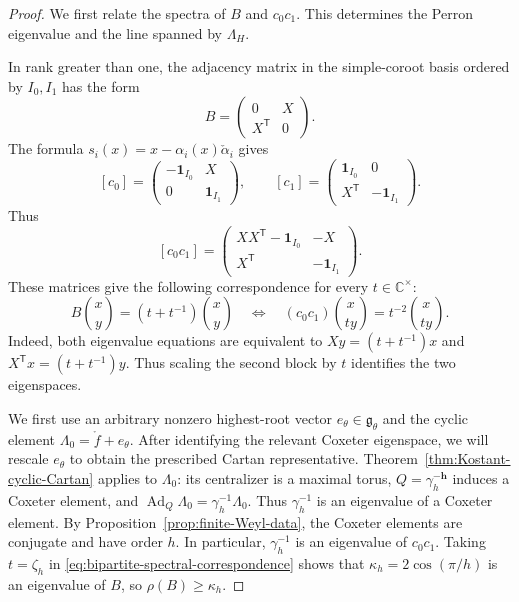 \documentclass[11pt,leqno]{amsart}
\numberwithin{equation}{section}
\theoremstyle{plain}
\theoremstyle{definition}
\theoremstyle{plain}
\theoremstyle{definition}
\theoremstyle{remark}
\newcommand{\g}{\mathfrak g}
\begin{document}
\begin{proof}
We first relate the spectra of $B$ and $c_0c_1$.  This determines the Perron eigenvalue and the line spanned by $\Lambda_H$.

In rank greater than one, the adjacency matrix in the simple-coroot basis ordered by $I_0,I_1$ has the form
\[
 B=\begin{pmatrix}0&X\\X^{\mathsf T}&0\end{pmatrix}.
\]
The formula $s_i(x)=x-\alpha_i(x)\check\alpha_i$ gives
\begin{equation}\label{eq:bipartite-reflection-blocks}
 [c_0]=\begin{pmatrix}-\mathbf1_{I_0}&X\\0&\mathbf1_{I_1}\end{pmatrix},
 \qquad
 [c_1]=\begin{pmatrix}\mathbf1_{I_0}&0\\X^{\mathsf T}&-\mathbf1_{I_1}\end{pmatrix}.
\end{equation}
Thus
\[
 [c_0c_1]=
 \begin{pmatrix}XX^{\mathsf T}-\mathbf1_{I_0}&-X\\
 X^{\mathsf T}&-\mathbf1_{I_1}\end{pmatrix}.
\]
These matrices give the following correspondence for every $t\in\mathbb C^\times$:
\begin{equation}\label{eq:bipartite-spectral-correspondence}
 B\binom{x}{y}=(t+t^{-1})\binom{x}{y}
 \quad\Longleftrightarrow\quad
 (c_0c_1)\binom{x}{ty}=t^{-2}\binom{x}{ty}.
\end{equation}
Indeed, both eigenvalue equations are equivalent to
$Xy=(t+t^{-1})x$ and $X^{\mathsf T}x=(t+t^{-1})y$.  Thus scaling the second block by $t$ identifies the two eigenspaces.

We first use an arbitrary nonzero highest-root vector $e_\theta\in\g_\theta$ and the cyclic element $\Lambda_0=\mathring f+e_\theta$.  After identifying the relevant Coxeter eigenspace, we will rescale $e_\theta$ to obtain the prescribed Cartan representative.  Theorem~\ref{thm:Kostant-cyclic-Cartan} applies to $\Lambda_0$: its centralizer is a maximal torus, $Q=\gamma_h^{-\mathbf h}$ induces a Coxeter element, and $\operatorname{Ad}_Q\Lambda_0=\gamma_h^{-1}\Lambda_0$.  Thus $\gamma_h^{-1}$ is an eigenvalue of a Coxeter element.  By Proposition~\ref{prop:finite-Weyl-data}, the Coxeter elements are conjugate and have order $h$.  In particular, $\gamma_h^{-1}$ is an eigenvalue of $c_0c_1$.  Taking $t=\zeta_h$ in \eqref{eq:bipartite-spectral-correspondence} shows that $\kappa_h=2\cos(\pi/h)$ is an eigenvalue of $B$, so $\rho(B)\ge\kappa_h$.


\end{proof}
\end{document}
